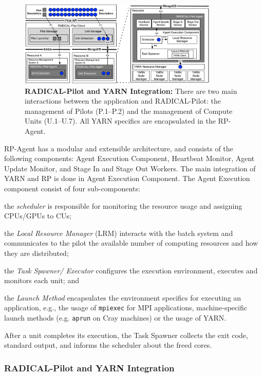 \begin{figure}
    \centering
    \includegraphics[width=0.85\textwidth]{figures/data_analytics_hpc/hpc_hadoop/rp-architecture-yarn.pdf}
    \caption{\textbf{RADICAL-Pilot and YARN Integration:} There are two main
    interactions between the application and RADICAL-Pilot: the management of
    Pilots (P.1--P.2) and the management of Compute Units (U.1--U.7). All YARN
    specifics are encapsulated in the RP-Agent.}
    \label{fig:comp_rp_arch}
\end{figure}

RP-Agent has a modular and extensible architecture, and consists of
the following components: Agent Execution Component, Heartbeat Monitor, Agent
Update Monitor, and Stage In and Stage Out Workers. The main integration of YARN
and RP is done in Agent Execution Component. The Agent Execution component
consist of four sub-components:
\begin{inparaenum}[a)]
    \item the \textit{scheduler} is responsible for monitoring the resource
    usage and assigning CPUs/GPUs to CUs;
    \item the \textit{Local Resource Manager} (LRM) interacts with the batch
    system and communicates to the pilot the available number of computing
    resources and how they are distributed;
    \item the \textit{Task Spawner/ Executor} configures the execution
    environment, executes and monitors each unit; and
    \item the \textit{Launch Method} encapsulates the environment specifics for
    executing an application, e.g., the usage of \texttt{mpiexec} for MPI
    applications, machine-specific launch methods (e.g. \texttt{aprun} on Cray
    machines) or the usage of YARN.
\end{inparaenum}
After a unit completes its execution, the Task Spawner collects the exit code,
standard output, and informs the scheduler about the freed cores.

\subsubsection*{RADICAL-Pilot and YARN Integration}
\label{sssec:rp-yarn}

